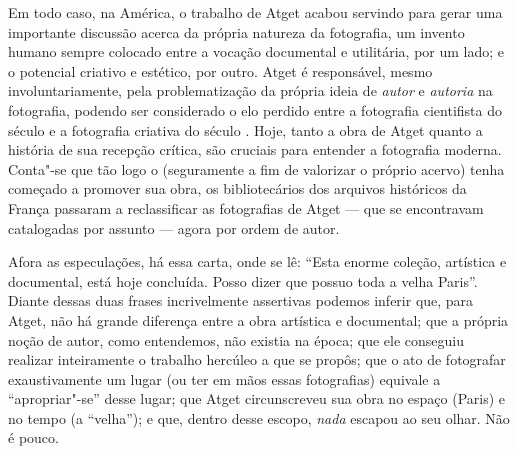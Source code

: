 Em todo caso, na América, o trabalho de Atget acabou servindo para gerar
uma importante discussão acerca da própria natureza da fotografia, um
invento humano sempre colocado entre a vocação documental e utilitária,
por um lado; e o potencial criativo e estético, por outro. Atget é
responsável, mesmo involuntariamente, pela problematização da própria
ideia de \emph{autor} e \emph{autoria} na fotografia, podendo ser
considerado o elo perdido entre a fotografia cientifista do século  e
a fotografia criativa do século . Hoje, tanto a obra de Atget quanto a
história de sua recepção crítica, são cruciais para entender a
fotografia moderna. Conta"-se que tão logo o  (seguramente a fim de
valorizar o próprio acervo) tenha começado a promover sua obra, os
bibliotecários dos arquivos históricos da França passaram a
reclassificar as fotografias de Atget --- que se encontravam catalogadas
por assunto --- agora por ordem de autor.

Afora as especulações, há essa carta, onde se lê: ``Esta enorme coleção,
artística e documental, está hoje concluída. Posso dizer que possuo toda
a velha Paris''. Diante dessas duas frases incrivelmente assertivas
podemos inferir que, para Atget, não há grande diferença entre a obra
artística e documental; que a própria noção de autor, como entendemos,
não existia na época; que ele conseguiu realizar inteiramente o trabalho
hercúleo a que se propôs; que o ato de fotografar exaustivamente um
lugar (ou ter em mãos essas fotografias) equivale a ``apropriar"-se''
desse lugar; que Atget circunscreveu sua obra no espaço (Paris) e no
tempo (a ``velha''); e que, dentro desse escopo, \emph{nada} escapou ao
seu olhar. Não é pouco.

